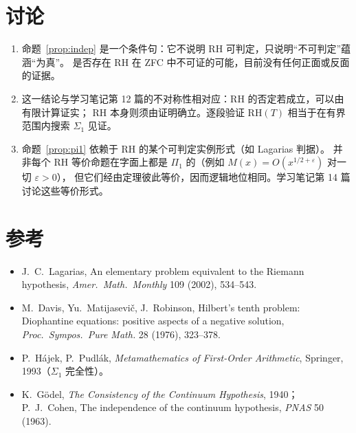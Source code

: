 \documentclass[11pt]{article}
\begin{document}
\section{讨论}
\begin{enumerate}
 \item 命题~\ref{prop:indep} 是一个条件句：它不说明 RH 可判定，只说明“不可判定”蕴涵“为真”。
 是否存在 RH 在 ZFC 中不可证的可能，目前没有任何正面或反面的证据。
 \item 这一结论与学习笔记第 12 篇的不对称性相对应：RH 的否定若成立，可以由有限计算证实；
 RH 本身则须由证明确立。逐段验证 $\mathrm{RH}(T)$ 相当于在有界范围内搜索 $\Sigma_1$ 见证。
 \item 命题~\ref{prop:pi1} 依赖于 RH 的某个可判定实例形式（如 Lagarias 判据）。
 并非每个 RH 等价命题在字面上都是 $\Pi_1$ 的（例如 $M(x)=O(x^{1/2+\varepsilon})$ 对一切 $\varepsilon>0$），
 但它们经由定理彼此等价，因而逻辑地位相同。学习笔记第 14 篇讨论这些等价形式。
\end{enumerate}

\section*{参考}
\begin{itemize}
 \item J.\ C.\ Lagarias, An elementary problem equivalent to the Riemann hypothesis, \emph{Amer.\ Math.\ Monthly} 109 (2002), 534--543.
 \item M.\ Davis, Yu.\ Matijasevič, J.\ Robinson, Hilbert's tenth problem: Diophantine equations: positive aspects of a negative solution,
 \emph{Proc.\ Sympos.\ Pure Math.} 28 (1976), 323--378.
 \item P.\ Hájek, P.\ Pudlák, \emph{Metamathematics of First-Order Arithmetic}, Springer, 1993（$\Sigma_1$ 完全性）。
 \item K.\ Gödel, \emph{The Consistency of the Continuum Hypothesis}, 1940；P.\ J.\ Cohen, The independence of the continuum hypothesis, \emph{PNAS} 50 (1963).
\end{itemize}
\end{document}
